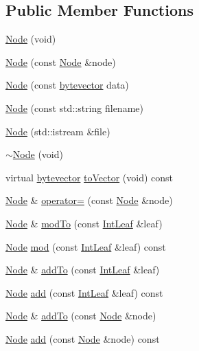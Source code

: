 \subsection*{Public Member Functions}
\begin{DoxyCompactItemize}
\item 
\hyperlink{class_node_a8d9cf8575744ca8c0f236a0a82eda096}{Node} (void)
\item 
\hyperlink{class_node_a4bf5930c1238505203c3dcf6e4573bad}{Node} (const \hyperlink{class_node}{Node} \&node)
\item 
\hyperlink{class_node_a3bb0c374e940be9178df34ba5272f92f}{Node} (const \hyperlink{types_8h_a64b5be62be31dcda165d2c6c3c262fb5}{bytevector} data)
\item 
\hyperlink{class_node_acdaa8db8d24d95d0c92218036a2df7e9}{Node} (const std\-::string filename)
\item 
\hyperlink{class_node_ae7672b93ee7885c40047f2f2f66578c0}{Node} (std\-::istream \&file)
\item 
\hyperlink{class_node_a2ba9aa5f85c0511a0608435419d248d1}{$\sim$\-Node} (void)
\item 
virtual \hyperlink{types_8h_a64b5be62be31dcda165d2c6c3c262fb5}{bytevector} \hyperlink{class_node_a858d4b4757880eba1fdead1412418693}{to\-Vector} (void) const 
\item 
\hyperlink{class_node}{Node} \& \hyperlink{class_node_a443734765d4e94a04ef8a5cba4c2d3fe}{operator=} (const \hyperlink{class_node}{Node} \&node)
\item 
\hyperlink{class_node}{Node} \& \hyperlink{class_node_aaf0d06b7e27f852f325c63b88eb33cdd}{mod\-To} (const \hyperlink{class_int_leaf}{Int\-Leaf} \&leaf)
\item 
\hyperlink{class_node}{Node} \hyperlink{class_node_a7744980c6da2415c02b583c5b149d50d}{mod} (const \hyperlink{class_int_leaf}{Int\-Leaf} \&leaf) const 
\item 
\hyperlink{class_node}{Node} \& \hyperlink{class_node_a6ca8cd41ea9f7579064f0c5ab4ae4ecf}{add\-To} (const \hyperlink{class_int_leaf}{Int\-Leaf} \&leaf)
\item 
\hyperlink{class_node}{Node} \hyperlink{class_node_ab3a58067bedece32403988a558ccbf96}{add} (const \hyperlink{class_int_leaf}{Int\-Leaf} \&leaf) const 
\item 
\hyperlink{class_node}{Node} \& \hyperlink{class_node_a7fc4be898d3ddebdc1a7341cc89a27f2}{add\-To} (const \hyperlink{class_node}{Node} \&node)
\item 
\hyperlink{class_node}{Node} \hyperlink{class_node_a162d4484dacf7c47d4e0bc13d3d29237}{add} (const \hyperlink{class_node}{Node} \&node) const 

\end{DoxyCompactItemize}
